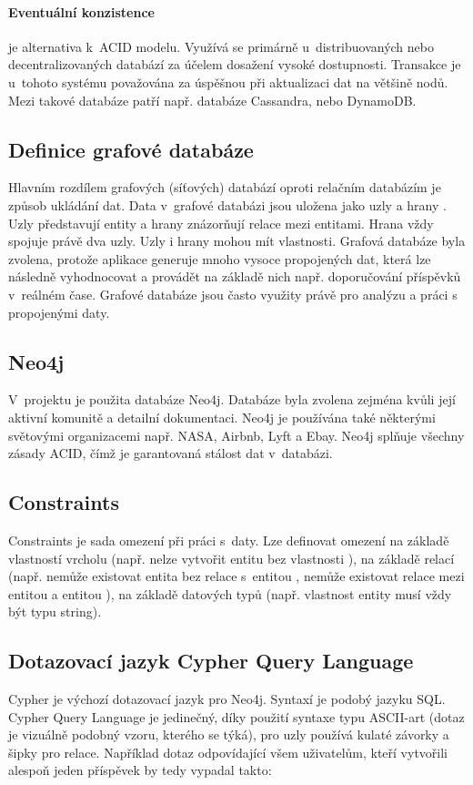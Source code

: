 \documentclass[12pt, a4paper,
  oneside,      %
]{report}
\begin{document}
\paragraph{Eventuální konzistence} je alternativa k~ACID modelu. Využívá se primárně u~distribuovaných nebo decentralizovaných databází za účelem dosažení vysoké dostupnosti. Transakce je u~tohoto systému považována za úspěšnou při aktualizaci dat na většině nodů. Mezi takové databáze patří např. databáze Cassandra, nebo DynamoDB.

\subsection{Definice grafové databáze}
Hlavním rozdílem grafových (síťových) databází oproti relačním databázím je způsob ukládání dat. Data v~grafové databázi jsou uložena jako uzly a hrany \cite{graphenTheorie}. Uzly představují entity a hrany znázorňují relace mezi entitami. Hrana vždy spojuje právě dva uzly.
Uzly i hrany mohou mít vlastnosti. Grafová databáze byla zvolena, protože aplikace generuje mnoho vysoce propojených dat, která
lze následně vyhodnocovat a provádět na základě nich např. doporučování příspěvků v~reálném čase. Grafové databáze jsou často využity právě pro analýzu a práci s propojenými daty. \cite{graphDatabasesIntroduction}\cite{graphAlgorithms}
\subsection{Neo4j}
V~projektu je použita databáze Neo4j. Databáze byla zvolena zejména kvůli její aktivní komunitě a detailní dokumentaci. Neo4j je používána také některými světovými organizacemi např. NASA, Airbnb, Lyft a Ebay. Neo4j splňuje všechny zásady ACID, čímž je garantovaná stálost dat v~databázi. \cite{aboutNeo4j}
\subsection{Constraints}
Constraints je sada omezení při práci s~daty. Lze definovat omezení na základě vlastností vrcholu (např. nelze vytvořit entitu  bez vlastnosti ), na základě relací (např. nemůže existovat entita  bez relace  s~entitou , nemůže existovat relace  mezi entitou  a entitou ), na základě datových typů (např. vlastnost  entity  musí vždy být typu string).

\subsection{Dotazovací jazyk Cypher Query Language}
Cypher je výchozí dotazovací jazyk pro Neo4j. Syntaxí je podobý jazyku SQL. Cypher Query Language je jedinečný, díky použití syntaxe typu ASCII-art (dotaz je vizuálně podobný vzoru, kterého se týká), pro uzly používá kulaté závorky a šipky pro relace. Například dotaz odpovídající všem uživatelům, kteří vytvořili alespoň jeden příspěvek by tedy vypadal takto:  \cite{CypherQL}
\end{document}
